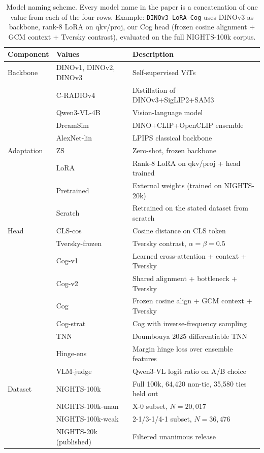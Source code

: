 \begin{table}[!ht]
\caption{Model naming scheme. Every model name in the paper is a concatenation of one value from each of the four rows. Example: \texttt{DINOv3-LoRA-Cog} uses DINOv3 as backbone, rank-8 LoRA on qkv/proj, our Cog head (frozen cosine alignment + GCM context + Tversky contrast), evaluated on the full NIGHTS-100k corpus.}
\label{tab:naming}
\centering
\small
\begin{tabular}{lll}
\toprule
Component & Values & Description \\
\midrule
Backbone & DINOv1, DINOv2, DINOv3 & Self-supervised ViTs \\
 & C-RADIOv4 & Distillation of DINOv3+SigLIP2+SAM3 \\
 & Qwen3-VL-4B & Vision-language model \\
 & DreamSim & DINO+CLIP+OpenCLIP ensemble \\
 & AlexNet-lin & LPIPS classical backbone \\
\midrule
Adaptation & ZS & Zero-shot, frozen backbone \\
 & LoRA & Rank-8 LoRA on qkv/proj + head trained \\
 & Pretrained & External weights (trained on NIGHTS-20k) \\
 & Scratch & Retrained on the stated dataset from scratch \\
\midrule
Head & CLS-cos & Cosine distance on CLS token \\
 & Tversky-frozen & Tversky contrast, $\alpha=\beta=0.5$ \\
 & Cog-v1 & Learned cross-attention + context + Tversky \\
 & Cog-v2 & Shared alignment + bottleneck + Tversky \\
 & Cog & Frozen cosine align + GCM context + Tversky \\
 & Cog-strat & Cog with inverse-frequency sampling \\
 & TNN & Doumbouya 2025 differentiable TNN \\
 & Hinge-ens & Margin hinge loss over ensemble features \\
 & VLM-judge & Qwen3-VL logit ratio on A/B choice \\
\midrule
Dataset & NIGHTS-100k & Full 100k, 64{,}420 non-tie, 35{,}580 ties held out \\
 & NIGHTS-100k-unan & X-0 subset, $N{=}20{,}017$ \\
 & NIGHTS-100k-weak & 2-1/3-1/4-1 subset, $N{=}36{,}476$ \\
 & NIGHTS-20k (published) & Filtered unanimous release \\
\bottomrule
\end{tabular}
\end{table}

